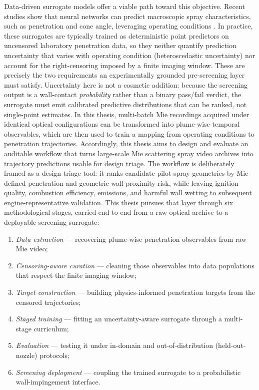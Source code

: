 Data-driven surrogate models offer a viable path toward this objective.
Recent studies show that neural networks can predict macroscopic spray characteristics, such as penetration and cone angle, leveraging operating conditions
\cite{VazKarathanasis2026,liu2020sprayreview}.
In practice, these surrogates are typically trained as deterministic point predictors on uncensored laboratory penetration data, so they neither quantify prediction uncertainty that varies with operating condition (heteroscedastic uncertainty) nor account for the right-censoring imposed by a finite imaging window. These are precisely the two requirements an experimentally grounded pre-screening layer must satisfy. Uncertainty here is not a cosmetic addition: because the screening output is a wall-contact \emph{probability} rather than a binary pass/fail verdict, the surrogate must emit calibrated predictive distributions that can be ranked, not single-point estimates.
In this thesis, multi-batch Mie recordings acquired under identical optical configurations can be transformed into plume-wise temporal observables, which are then used to train a mapping from operating conditions to penetration trajectories.
Accordingly, this thesis aims to design and evaluate an auditable workflow that turns large-scale Mie scattering spray video archives into trajectory predictions usable for design triage.
The workflow is deliberately framed as a design triage tool: it ranks candidate pilot-spray geometries by Mie-defined penetration and geometric wall-proximity risk, while leaving ignition quality, combustion efficiency, emissions, and harmful wall wetting to subsequent engine-representative validation.
This thesis pursues that layer through six methodological stages, carried end to end from a raw optical archive to a deployable screening surrogate:
\begin{enumerate}
  \item \emph{Data extraction} --- recovering plume-wise penetration observables from raw Mie video;
  \item \emph{Censoring-aware curation} --- cleaning those observables into data populations that respect the finite imaging window;
  \item \emph{Target construction} --- building physics-informed penetration targets from the censored trajectories;
  \item \emph{Staged training} --- fitting an uncertainty-aware surrogate through a multi-stage curriculum;
  \item \emph{Evaluation} --- testing it under in-domain and out-of-distribution (held-out-nozzle) protocols;
  \item \emph{Screening deployment} --- coupling the trained surrogate to a probabilistic wall-impingement interface.
\end{enumerate}
